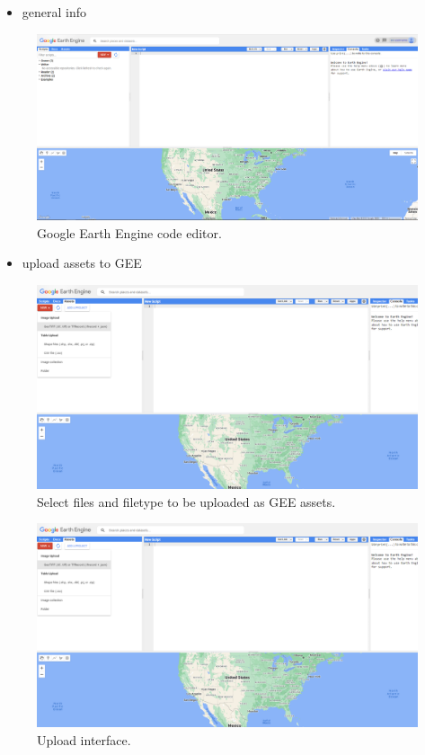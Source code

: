 \documentclass[
  10pt,
  b5paper,
  oneside]{book}
\providecommand{\tightlist}{%
  \setlength{\itemsep}{0pt}\setlength{\parskip}{0pt}}
\begin{document}
\begin{itemize}
\tightlist
\item
  general info
\end{itemize}

\begin{figure}
\includegraphics[width=12cm]{images/2.1_GEE_codeeditor} \caption{Google Earth Engine code editor.}\label{fig:unnamed-chunk-1}
\end{figure}

\begin{itemize}
\tightlist
\item
  upload assets to GEE
\end{itemize}

\begin{figure}
\includegraphics[width=12cm]{images/2.2_upload-assets-1} \caption{Select files and filetype to be uploaded as GEE assets.}\label{fig:unnamed-chunk-2}
\end{figure}

\begin{figure}
\includegraphics[width=12cm]{images/2.2_upload-assets-2} \caption{Upload interface.}\label{fig:unnamed-chunk-3}
\end{figure}
\end{document}
